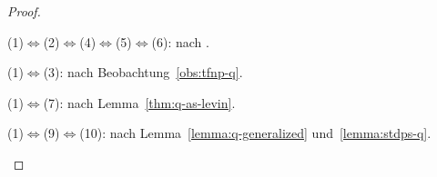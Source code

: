 \begin{proof}
\begin{prooflist}[label={\arabic*.},labelsep=3pt]
\item (1)$\iff$(2)$\iff$(4)$\iff$(5)$\iff$(6): nach \textcite[Thm.~2]{fenner_inverting_2003}. 

\item (1)$\iff$(3): nach Beobachtung~\ref{obs:tfnp-q}.

\item (1)$\iff$(7): nach Lemma~\ref{thm:q-as-levin}.

\item (1)$\iff$(9)$\iff$(10): nach Lemma~\ref{lemma:q-generalized} und~\ref{lemma:stdps-q}.






\end{prooflist}
\end{proof}
